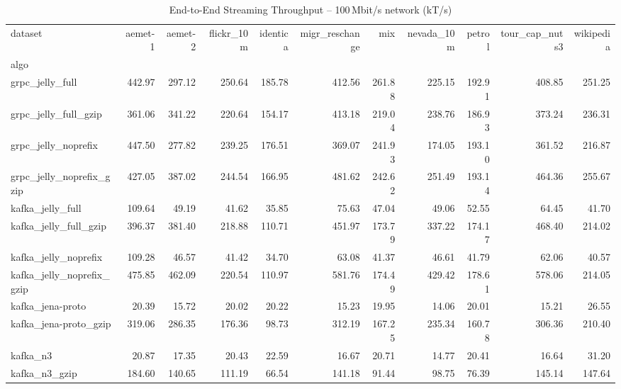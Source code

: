 \begin{table}[h!]
\small
\centering
\caption{End-to-End Streaming Throughput -- 100\,Mbit/s network (kT/s)}
\begin{tabular}{lrrrrrrrrrr}
\toprule
dataset &  aemet-1 &  aemet-2 &  flickr\_10m &  identica &  migr\_reschange &    mix &  nevada\_10m &  petrol &  tour\_cap\_nuts3 &  wikipedia \\
algo                      &          &          &             &           &                 &        &             &         &                 &            \\
\midrule
grpc\_jelly\_full           &   442.97 &   297.12 &      250.64 &    185.78 &          412.56 & 261.88 &      225.15 &  192.91 &          408.85 &     251.25 \\
grpc\_jelly\_full\_gzip      &   361.06 &   341.22 &      220.64 &    154.17 &          413.18 & 219.04 &      238.76 &  186.93 &          373.24 &     236.31 \\
grpc\_jelly\_noprefix       &   447.50 &   277.82 &      239.25 &    176.51 &          369.07 & 241.93 &      174.05 &  193.10 &          361.52 &     216.87 \\
grpc\_jelly\_noprefix\_gzip  &   427.05 &   387.02 &      244.54 &    166.95 &          481.62 & 242.62 &      251.49 &  193.14 &          464.36 &     255.67 \\
kafka\_jelly\_full          &   109.64 &    49.19 &       41.62 &     35.85 &           75.63 &  47.04 &       49.06 &   52.55 &           64.45 &      41.70 \\
kafka\_jelly\_full\_gzip     &   396.37 &   381.40 &      218.88 &    110.71 &          451.97 & 173.79 &      337.22 &  174.17 &          468.40 &     214.02 \\
kafka\_jelly\_noprefix      &   109.28 &    46.57 &       41.42 &     34.70 &           63.08 &  41.37 &       46.61 &   41.79 &           62.06 &      40.57 \\
kafka\_jelly\_noprefix\_gzip &   475.85 &   462.09 &      220.54 &    110.97 &          581.76 & 174.49 &      429.42 &  178.61 &          578.06 &     214.05 \\
kafka\_jena-proto          &    20.39 &    15.72 &       20.02 &     20.22 &           15.23 &  19.95 &       14.06 &   20.01 &           15.21 &      26.55 \\
kafka\_jena-proto\_gzip     &   319.06 &   286.35 &      176.36 &     98.73 &          312.19 & 167.25 &      235.34 &  160.78 &          306.36 &     210.40 \\
kafka\_n3                  &    20.87 &    17.35 &       20.43 &     22.59 &           16.67 &  20.71 &       14.77 &   20.41 &           16.64 &      31.20 \\
kafka\_n3\_gzip             &   184.60 &   140.65 &      111.19 &     66.54 &          141.18 &  91.44 &       98.75 &   76.39 &          145.14 &     147.64 \\
\bottomrule
\end{tabular}
\end{table}
